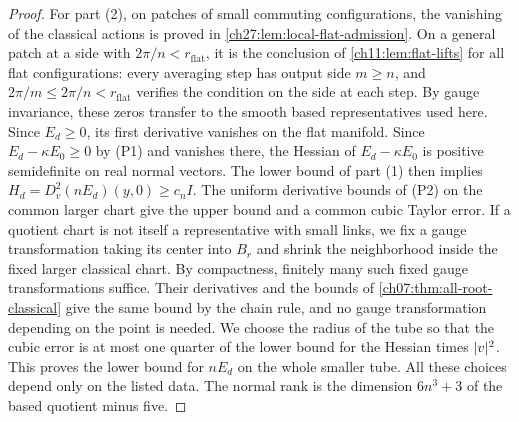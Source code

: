 \begin{proof}
For part (2), on patches of small commuting configurations, the vanishing of the classical actions is proved in \cref{ch27:lem:local-flat-admission}. On a general patch at a side with $2\pi/n<r_{\mathrm{flat}}$, it is the conclusion of \cref{ch11:lem:flat-lifts} for all flat configurations: every averaging step has output side $m\ge n$, and $2\pi/m\le2\pi/n<r_{\mathrm{flat}}$ verifies the condition on the side at each step. By gauge invariance, these zeros transfer to the smooth based representatives used here. Since $E_d\ge0$, its first derivative vanishes on the flat manifold. Since $E_d-\kappa E_0\ge0$ by (P1) and vanishes there, the Hessian of $E_d-\kappa E_0$ is positive semidefinite on real normal vectors. The lower bound of part (1) then implies $H_d=D_v^2(nE_d)(y,0)\ge c_nI$. The uniform derivative bounds of (P2) on the common larger chart give the upper bound and a common cubic Taylor error. If a quotient chart is not itself a representative with small links, we fix a gauge transformation taking its center into $B_r$ and shrink the neighborhood inside the fixed larger classical chart. By compactness, finitely many such fixed gauge transformations suffice. Their derivatives and the bounds of \cref{ch07:thm:all-root-classical} give the same bound by the chain rule, and no gauge transformation depending on the point is needed. We choose the radius of the tube so that the cubic error is at most one quarter of the lower bound for the Hessian times $\lvert v\rvert^2$. This proves the lower bound for $nE_d$ on the whole smaller tube. All these choices depend only on the listed data. The normal rank is the dimension $6n^3+3$ of the based quotient minus five.
\end{proof}

